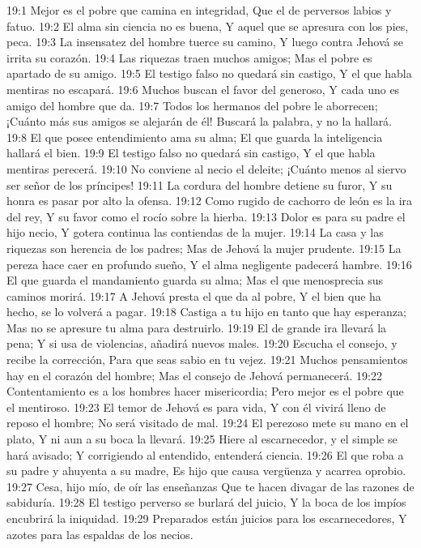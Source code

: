 19:1 Mejor es el pobre que camina en integridad,  
Que el de perversos labios y fatuo.  
19:2 El alma sin ciencia no es buena,  
Y aquel que se apresura con los pies, peca.  
19:3 La insensatez del hombre tuerce su camino,  
Y luego contra Jehová se irrita su corazón.  
19:4 Las riquezas traen muchos amigos;  
Mas el pobre es apartado de su amigo.  
19:5 El testigo falso no quedará sin castigo,  
Y el que habla mentiras no escapará.  
19:6 Muchos buscan el favor del generoso,  
Y cada uno es amigo del hombre que da.  
19:7 Todos los hermanos del pobre le aborrecen;  
¡Cuánto más sus amigos se alejarán de él!  
Buscará la palabra, y no la hallará.  
19:8 El que posee entendimiento ama su alma;  
El que guarda la inteligencia hallará el bien.  
19:9 El testigo falso no quedará sin castigo,  
Y el que habla mentiras perecerá.  
19:10 No conviene al necio el deleite;  
¡Cuánto menos al siervo ser señor de los príncipes!  
19:11 La cordura del hombre detiene su furor,  
Y su honra es pasar por alto la ofensa.  
19:12 Como rugido de cachorro de león es la ira del rey,  
Y su favor como el rocío sobre la hierba.  
19:13 Dolor es para su padre el hijo necio,  
Y gotera continua las contiendas de la mujer.  
19:14 La casa y las riquezas son herencia de los padres;  
Mas de Jehová la mujer prudente.  
19:15 La pereza hace caer en profundo sueño,  
Y el alma negligente padecerá hambre.  
19:16 El que guarda el mandamiento guarda su alma;  
Mas el que menosprecia sus caminos morirá.  
19:17 A Jehová presta el que da al pobre,  
Y el bien que ha hecho, se lo volverá a pagar.  
19:18 Castiga a tu hijo en tanto que hay esperanza; 
Mas no se apresure tu alma para destruirlo.  
19:19 El de grande ira llevará la pena;  
Y si usa de violencias, añadirá nuevos males.  
19:20 Escucha el consejo, y recibe la corrección,  
Para que seas sabio en tu vejez. 
19:21 Muchos pensamientos hay en el corazón del hombre;  
Mas el consejo de Jehová permanecerá. 
19:22 Contentamiento es a los hombres hacer misericordia;  
Pero mejor es el pobre que el mentiroso.  
19:23 El temor de Jehová es para vida,  
Y con él vivirá lleno de reposo el hombre;  
No será visitado de mal.  
19:24 El perezoso mete su mano en el plato,  
Y ni aun a su boca la llevará.  
19:25 Hiere al escarnecedor, y el simple se hará avisado;  
Y corrigiendo al entendido, entenderá ciencia.  
19:26 El que roba a su padre y ahuyenta a su madre,  
Es hijo que causa vergüenza y acarrea oprobio.  
19:27 Cesa, hijo mío, de oír las enseñanzas  
Que te hacen divagar de las razones de sabiduría.  
19:28 El testigo perverso se burlará del juicio,  
Y la boca de los impíos encubrirá la iniquidad.  
19:29 Preparados están juicios para los escarnecedores,  
Y azotes para las espaldas de los necios.  

